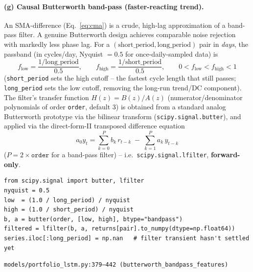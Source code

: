 \documentclass[11pt]{article}
\newcommand{\srcref}[1]{\hfill\textcolor{cmtcolor}{\footnotesize\texttt{#1}}}
\begin{document}
\paragraph{(g) Causal Butterworth band-pass (faster-reacting trend).} An SMA-difference
(Eq.~\ref{eq:cma}) is a crude, high-lag approximation of a band-pass filter. A genuine
Butterworth design achieves comparable noise rejection with markedly less phase lag. For a
$(\text{short\_period}, \text{long\_period})$ pair in \emph{days}, the passband (in cycles/day,
Nyquist $= 0.5$ for once-daily-sampled data) is
\begin{equation}
  f_{\text{low}} = \frac{1/\text{long\_period}}{0.5}, \qquad
  f_{\text{high}} = \frac{1/\text{short\_period}}{0.5}, \qquad
  0 < f_{\text{low}} < f_{\text{high}} < 1
  \label{eq:bandedges}
\end{equation}
(\texttt{short\_period} sets the high cutoff -- the fastest cycle length that still passes;
\texttt{long\_period} sets the low cutoff, removing the long-run trend/DC component). The
filter's transfer function $H(z) = B(z)/A(z)$ (numerator/denominator polynomials of order
\texttt{order}, default 3) is obtained from a standard analog Butterworth prototype via the
bilinear transform (\texttt{scipy.signal.butter}), and applied via the direct-form-II
transposed difference equation
\begin{equation}
  a_0 y_t = \sum_{k=0}^{P} b_k\, r_{t-k} \;-\; \sum_{k=1}^{P} a_k\, y_{t-k}
  \label{eq:lfilter}
\end{equation}
($P = 2\!\times\!\texttt{order}$ for a band-pass filter) -- i.e.\ \texttt{scipy.signal.lfilter},
\textbf{forward-only}.

\begin{lstlisting}[caption={Causal Butterworth band-pass - \texttt{lfilter}, deliberately NOT \texttt{filtfilt}.}, label=lst:bandpass]
from scipy.signal import butter, lfilter
nyquist = 0.5
low  = (1.0 / long_period) / nyquist
high = (1.0 / short_period) / nyquist
b, a = butter(order, [low, high], btype="bandpass")
filtered = lfilter(b, a, returns[pair].to_numpy(dtype=np.float64))
series.iloc[:long_period] = np.nan   # filter transient hasn't settled yet
\end{lstlisting}
\srcref{models/portfolio\_lstm.py:379--442 (\texttt{butterworth\_bandpass\_features})}
\end{document}
